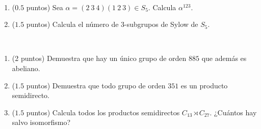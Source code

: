 \documentclass[12pt]{article}
\begin{document}
    \begin{ejercicio}~
        \begin{enumerate}
            \item ($0.5$ puntos) Sea $\alpha=(2\ 3\ 4)(1\ 2\ 3) \in S_5$. Calcula $\alpha^{123}$.
            \item ($1.5$ puntos) Calcula el número de $3$-subgrupos de Sylow de $S_5$.
        \end{enumerate}
    \end{ejercicio}

    \begin{ejercicio}~
        \begin{enumerate}
            \item (2 puntos) Demuestra que hay un único grupo de orden $885$ que además es abeliano.
            \item ($1.5$ puntos) Demuestra que todo grupo de orden $351$ es un producto semidirecto.
            \item ($1.5$ puntos) Calcula todos los productos semidirectos $C_{13} \rtimes C_{27}$. ¿Cuántos hay salvo isomorfismo?
        \end{enumerate}
    \end{ejercicio}



    \newpage
    \setcounter{ejercicio}{0}
\end{document}

